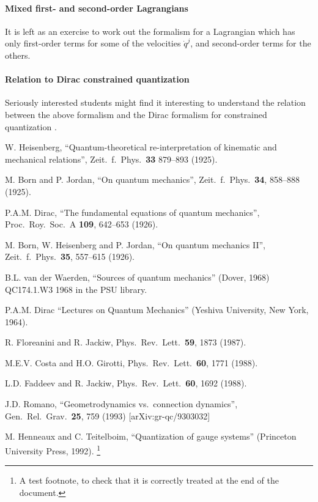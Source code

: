 \documentclass{article}
\begin{document}
\paragraph{Mixed first- and second-order Lagrangians}
It is left as an exercise to work out the formalism for a Lagrangian
which has only first-order terms for some of the velocities
$\dot{q}^j$, and second-order terms for the others.


\paragraph{Relation to Dirac constrained quantization}
Seriously interested students might find it interesting to understand
the relation between the above formalism and the Dirac formalism for
constrained quantization \cite{Dirac.constrained,Henneaux.Teitelboim}.



\begin{thebibliography}{99}

 W. Heisenberg, ``Quantum-theoretical
  re-interpretation of kinematic and mechanical relations'', Zeit.\
  f.\ Phys.\ \textbf{33} 879--893 (1925).

 M. Born and P. Jordan, ``On quantum mechanics'',
  Zeit.\ f.\ Phys.\ \textbf{34}, 858--888 (1925).

 P.A.M. Dirac, ``The fundamental equations of quantum
  mechanics'', Proc.\ Roy.\ Soc.\ A \textbf{109}, 642--653 (1926).

 M. Born, W. Heisenberg and P. Jordan,
  ``On quantum mechanics II'', Zeit.\ f.\ Phys.\ \textbf{35}, 557--615
  (1926).

 B.L. van der Waerden, ``Sources of quantum
  mechanics'' (Dover, 1968) QC174.1.W3 1968 in the PSU library.

 P.A.M. Dirac ``Lectures on Quantum
  Mechanics'' (Yeshiva University, New York, 1964).

 R. Floreanini and R. Jackiw, Phys.\ Rev.\
  Lett.\ \textbf{59}, 1873 (1987).

 M.E.V. Costa and H.O. Girotti, Phys.\ Rev.\
  Lett.\ \textbf{60}, 1771 (1988).

\bibitem{Faddeev.Jackiw} L.D. Faddeev and R. Jackiw, Phys.\ Rev.\
  Lett.\ \textbf{60}, 1692 (1988).

 J.D. Romano, ``Geometrodynamics vs.\ connection
  dynamics'', Gen.\ Rel.\ Grav.\ {\bf 25}, 759 (1993)
  [arXiv:gr-qc/9303032]

\bibitem{Henneaux.Teitelboim} M. Henneaux and C. Teitelboim,
  ``Quantization of gauge systems'' (Princeton University Press,
  1992).
  \footnote{A test footnote, to check that it is correctly treated at
    the end of the document.}

\end{thebibliography}
\end{document}
